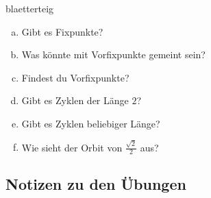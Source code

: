 \documentclass[%
<<<<<<< Updated upstream
11pt,%
twoside,%
titlepage,%
german,%
headsepline%
]{scrartcl}
\begin{document}
\begin{uebenv}{blaetterteig}
\begin{enumerate}[a)]
    \item Gibt es Fixpunkte?
    \item Was könnte mit Vorfixpunkte gemeint sein?
    \item Findest du Vorfixpunkte?
    \item Gibt es Zyklen der Länge $2$?
    \item Gibt es Zyklen beliebiger Länge?
    \item Wie sieht der Orbit von $\frac{\sqrt{2}}{2}$ aus?
\end{enumerate}
\end{uebenv}

\clearpage

\subsection{Notizen zu den Übungen}
\end{document}
